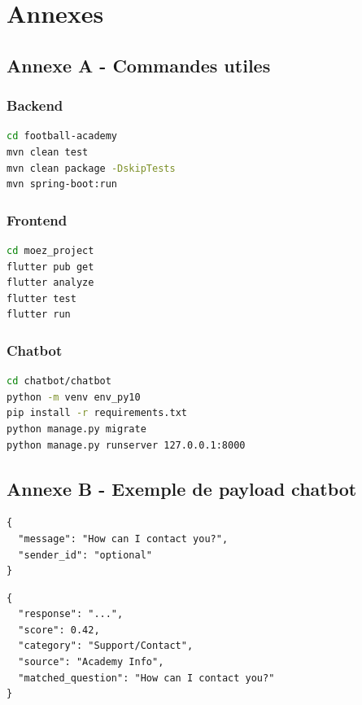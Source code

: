 \chapter{Annexes}

\section{Annexe A - Commandes utiles}

\subsection*{Backend}
\begin{lstlisting}[style=codeblock,language=bash]
cd football-academy
mvn clean test
mvn clean package -DskipTests
mvn spring-boot:run
\end{lstlisting}

\subsection*{Frontend}
\begin{lstlisting}[style=codeblock,language=bash]
cd moez_project
flutter pub get
flutter analyze
flutter test
flutter run
\end{lstlisting}

\subsection*{Chatbot}
\begin{lstlisting}[style=codeblock,language=bash]
cd chatbot/chatbot
python -m venv env_py10
pip install -r requirements.txt
python manage.py migrate
python manage.py runserver 127.0.0.1:8000
\end{lstlisting}

\section{Annexe B - Exemple de payload chatbot}

\begin{lstlisting}[style=codeblock]
{
  "message": "How can I contact you?",
  "sender_id": "optional"
}
\end{lstlisting}

\begin{lstlisting}[style=codeblock]
{
  "response": "...",
  "score": 0.42,
  "category": "Support/Contact",
  "source": "Academy Info",
  "matched_question": "How can I contact you?"
}
\end{lstlisting}

